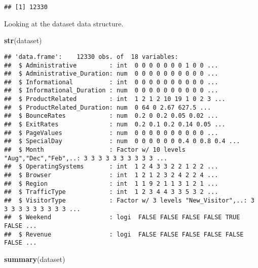 \documentclass[
]{article}
\newenvironment{Shaded}{\begin{snugshade}}{\end{snugshade}}
\newcommand{\KeywordTok}[1]{\textcolor[rgb]{0.13,0.29,0.53}{\textbf{#1}}}
\newcommand{\NormalTok}[1]{#1}
\begin{document}
\begin{verbatim}
## [1] 12330
\end{verbatim}

Looking at the dataset data structure.

\begin{Shaded}
\begin{Highlighting}[]
\KeywordTok{str}\NormalTok{(dataset)}
\end{Highlighting}
\end{Shaded}

\begin{verbatim}
## 'data.frame':    12330 obs. of  18 variables:
##  $ Administrative         : int  0 0 0 0 0 0 0 1 0 0 ...
##  $ Administrative_Duration: num  0 0 0 0 0 0 0 0 0 0 ...
##  $ Informational          : int  0 0 0 0 0 0 0 0 0 0 ...
##  $ Informational_Duration : num  0 0 0 0 0 0 0 0 0 0 ...
##  $ ProductRelated         : int  1 2 1 2 10 19 1 0 2 3 ...
##  $ ProductRelated_Duration: num  0 64 0 2.67 627.5 ...
##  $ BounceRates            : num  0.2 0 0.2 0.05 0.02 ...
##  $ ExitRates              : num  0.2 0.1 0.2 0.14 0.05 ...
##  $ PageValues             : num  0 0 0 0 0 0 0 0 0 0 ...
##  $ SpecialDay             : num  0 0 0 0 0 0 0.4 0 0.8 0.4 ...
##  $ Month                  : Factor w/ 10 levels "Aug","Dec","Feb",..: 3 3 3 3 3 3 3 3 3 3 ...
##  $ OperatingSystems       : int  1 2 4 3 3 2 2 1 2 2 ...
##  $ Browser                : int  1 2 1 2 3 2 4 2 2 4 ...
##  $ Region                 : int  1 1 9 2 1 1 3 1 2 1 ...
##  $ TrafficType            : int  1 2 3 4 4 3 3 5 3 2 ...
##  $ VisitorType            : Factor w/ 3 levels "New_Visitor",..: 3 3 3 3 3 3 3 3 3 3 ...
##  $ Weekend                : logi  FALSE FALSE FALSE FALSE TRUE FALSE ...
##  $ Revenue                : logi  FALSE FALSE FALSE FALSE FALSE FALSE ...
\end{verbatim}

\begin{Shaded}
\begin{Highlighting}[]
\KeywordTok{summary}\NormalTok{(dataset)}
\end{Highlighting}
\end{Shaded}
\end{document}
